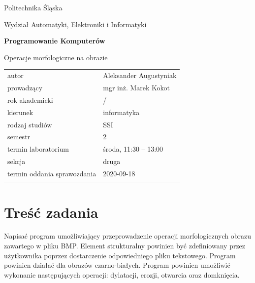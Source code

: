 \documentclass[12pt,a4paper,twoside]{article}
\newcounter{rok}
\newcommand{\rokakademicki}{%
   \setcounter{rok}{\number\year}%
   \ifthenelse{\number\month<10}%
   {\addtocounter{rok}{-1}}%
   {}%
   \arabic{rok}/\addtocounter{rok}{1}\arabic{rok}
}
\begin{document}
\frenchspacing
\thispagestyle{empty}
\begin{center}
{\Large\sf Politechnika Śląska   %

Wydział Automatyki, Elektroniki i Informatyki

}

\vfill

 

\vfill\vfill

{\Huge\sffamily\bfseries Programowanie Komputerów\par}  

\vfill\vfill

{\LARGE\sf Operacje morfologiczne na obrazie}   


\vfill \vfill\vfill\vfill






\begin{tabular}{ll}
	\toprule
	autor                       & Aleksander Augustyniak     \\
	prowadzący                  & mgr inż. Marek Kokot  \\
	rok akademicki              & \rokakademicki         \\
	kierunek                    & informatyka            \\
	rodzaj studiów              & SSI                    \\
	semestr                     & 2                      \\
	termin laboratorium         & środa, 11:30 – 13:00 \\
	sekcja                      & druga                     \\
	termin oddania sprawozdania & 2020-09-18             \\
	\bottomrule
	                            &
\end{tabular}

\end{center}

\cleardoublepage

\section{Treść zadania}
Napisać program umożliwiający przeprowadzenie operacji morfologicznych obrazu zawartego w pliku BMP. Element strukturalny powinien być zdefiniowany przez użytkownika poprzez dostarczenie odpowiedniego pliku tekstowego. Program powinien działać dla obrazów czarno-białych. Program
powinien umożliwić wykonanie następujących operacji: dylatacji, erozji, otwarcia oraz domknięcia. \cite{id:BMPWiki}
\end{document}
